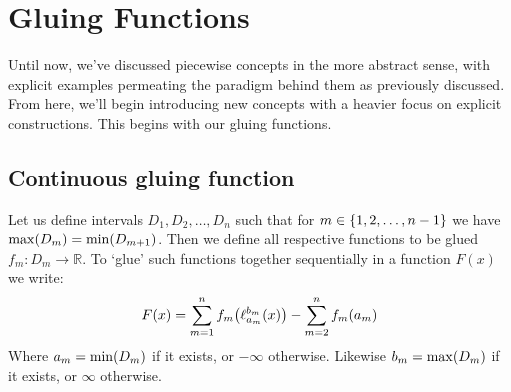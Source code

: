 \section{Gluing Functions}
Until now, we've discussed piecewise concepts in the more abstract sense, with explicit examples permeating the paradigm behind them as previously discussed. From here, we'll begin introducing new concepts with a heavier focus on explicit constructions. This begins with our gluing functions.

\subsection{Continuous gluing function}
Let us define intervals $D_1,D_2,\dots,D_n$ such that for $m\in\{1,2,\dots,n-1\}$ we have $\max(D_m)=\min(D_{m+1})$. Then we define all respective functions to be glued $f_m:D_m\to\mathbb{R}$. To `glue' such functions together sequentially in a function $F(x)$ we write:
$$
    F(x)=\sum_{m=1}^{n}{f_m\paren*{\ell_{a_m}^{b_m}\paren{x}}}-\sum_{m=2}^{n}{f_m\paren*{a_m}}
$$
Where $a_m=\min(D_m)$ if it exists, or $-\infty$ otherwise. Likewise $b_m=\max(D_m)$ if it exists, or $\infty$ otherwise.

